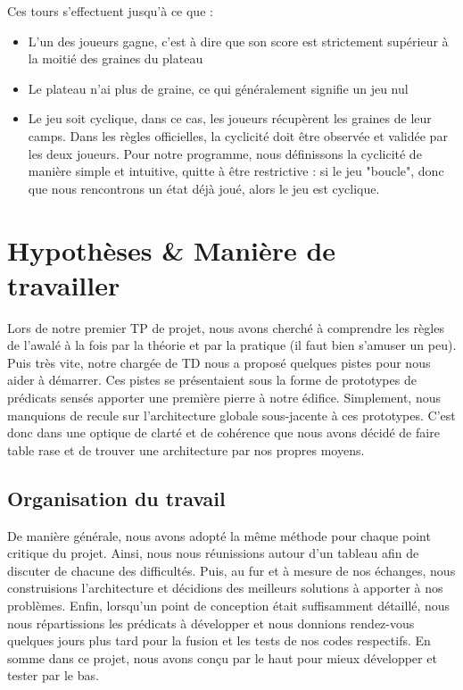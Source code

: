 \documentclass[]{article}
\begin{document}
Ces tours s'effectuent jusqu'à ce que :
\begin{itemize}
\item L'un des joueurs gagne, c'est à dire que son score est strictement supérieur à la moitié des graines du plateau
\item Le plateau n'ai plus de graine, ce qui généralement signifie un jeu nul
\item Le jeu soit cyclique, dans ce cas, les joueurs récupèrent les graines de leur camps. Dans les règles officielles, la cyclicité doit être observée et validée par les deux joueurs. Pour notre programme, nous définissons la cyclicité de manière simple et intuitive, quitte à être restrictive : si le jeu "boucle", donc que nous rencontrons un état déjà joué, alors le jeu est cyclique.
\end{itemize}



\section{Hypothèses \& Manière de travailler}

	Lors de notre premier TP de projet, nous avons cherché à comprendre les règles de l'awalé à la fois par la théorie et par la pratique (il faut bien s'amuser un peu).
Puis très vite, notre chargée de TD nous a proposé quelques pistes pour nous aider à démarrer. Ces pistes se présentaient sous la forme de prototypes de prédicats sensés apporter une première pierre à notre édifice.
Simplement, nous manquions de recule sur l'architecture globale sous-jacente à ces prototypes. C'est donc dans une optique de clarté et de cohérence que nous avons décidé de faire table rase et de trouver une architecture par nos propres moyens.

\subsection{Organisation du travail}

	De manière générale, nous avons adopté la même méthode pour chaque point critique du projet.
Ainsi, nous nous réunissions autour d'un tableau afin de discuter de chacune des difficultés. Puis, au fur et à mesure de nos échanges, nous construisions l'architecture et décidions des meilleurs solutions à apporter à nos problèmes.
Enfin, lorsqu'un point de conception était suffisamment détaillé, nous nous répartissions les prédicats à développer et nous donnions rendez-vous quelques jours plus tard pour la fusion et les tests de nos codes respectifs.
En somme dans ce projet, nous avons conçu par le haut pour mieux développer et tester par le bas.
\end{document}
